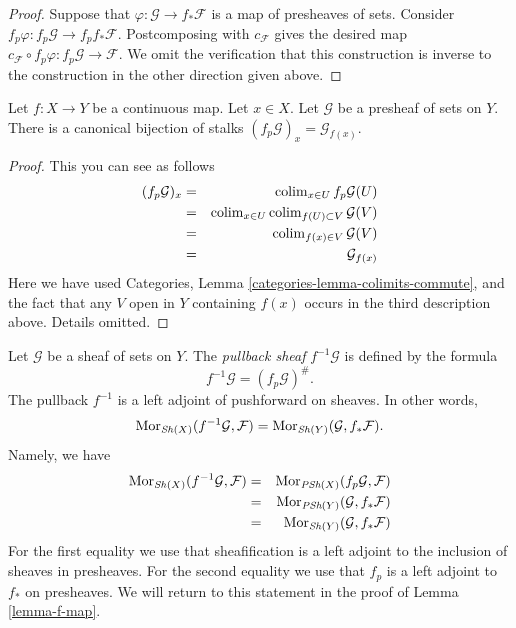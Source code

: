 \begin{proof}
\medskip\noindent
Suppose that $\varphi : \mathcal{G} \to f_*\mathcal{F}$
is a map of presheaves of sets. Consider $f_p\varphi :
f_p \mathcal{G} \to f_p f_* \mathcal{F}$.
Postcomposing with $c_\mathcal{F}$ gives the desired map
$c_\mathcal{F} \circ f_p\varphi : f_p\mathcal{G} \to \mathcal{F}$.
We omit the verification that this construction is inverse
to the construction in the other direction given above.
\end{proof}

\begin{lemma}
\label{lemma-stalk-pullback-presheaf}
Let $f : X \to Y$ be a continuous map.
Let $x \in X$. Let $\mathcal{G}$ be a presheaf of sets on $Y$.
There is a canonical bijection of stalks
$(f_p\mathcal{G})_x = \mathcal{G}_{f(x)}$.
\end{lemma}

\begin{proof}
This you can see as follows
\begin{eqnarray*}
(f_p\mathcal{G})_x
& = &
\mathop{\mathrm{colim}}\nolimits_{x \in U} f_p\mathcal{G}(U) \\
& = &
\mathop{\mathrm{colim}}\nolimits_{x \in U} \mathop{\mathrm{colim}}\nolimits_{f(U) \subset V} \mathcal{G}(V) \\
& = &
\mathop{\mathrm{colim}}\nolimits_{f(x) \in V} \mathcal{G}(V) \\
& = &
\mathcal{G}_{f(x)}
\end{eqnarray*}
Here we have used
Categories, Lemma \ref{categories-lemma-colimits-commute},
and the fact that any $V$ open in $Y$ containing $f(x)$
occurs in the third description above. Details omitted.
\end{proof}

\noindent
Let $\mathcal{G}$ be a sheaf of sets on $Y$.
The {\it pullback sheaf} $f^{-1}\mathcal{G}$ is defined
by the formula
$$
f^{-1}\mathcal{G} = (f_p\mathcal{G})^\# .
$$
The pullback $f^{-1}$ is a left adjoint of
pushforward on sheaves. In other words,
$$
\mathop{\mathrm{Mor}}\nolimits_{\mathop{\mathit{Sh}}\nolimits(X)}(f^{-1}\mathcal{G}, \mathcal{F})
=
\mathop{\mathrm{Mor}}\nolimits_{\mathop{\mathit{Sh}}\nolimits(Y)}(\mathcal{G}, f_*\mathcal{F}).
$$
Namely, we have
\begin{eqnarray*}
\mathop{\mathrm{Mor}}\nolimits_{\mathop{\mathit{Sh}}\nolimits(X)}(f^{-1}\mathcal{G}, \mathcal{F})
& = &
\mathop{\mathrm{Mor}}\nolimits_{\textit{PSh}(X)}(f_p\mathcal{G}, \mathcal{F}) \\
& = &
\mathop{\mathrm{Mor}}\nolimits_{\textit{PSh}(Y)}(\mathcal{G}, f_*\mathcal{F}) \\
& = &
\mathop{\mathrm{Mor}}\nolimits_{\mathop{\mathit{Sh}}\nolimits(Y)}(\mathcal{G}, f_*\mathcal{F})
\end{eqnarray*}
For the first equality we use that sheafification is a left adjoint
to the inclusion of sheaves in presheaves. For the second equality
we use that $f_p$ is a left adjoint to $f_*$ on presheaves. We will return
to this statement in the proof of Lemma \ref{lemma-f-map}.

